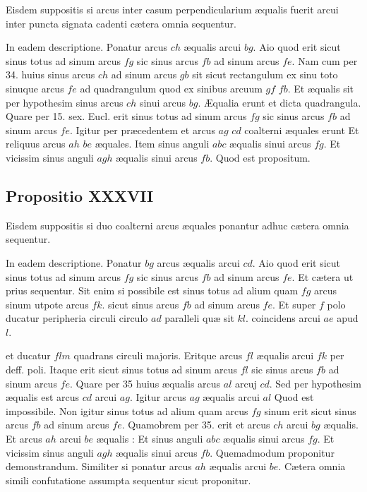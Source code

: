 \documentclass[11pt,a4paper]{article}
\begin{document}
Eisdem suppositis si arcus inter casum perpendicularium æqualis fuerit arcui inter puncta signata cadenti cætera omnia sequentur.

In eadem descriptione. Ponatur arcus $ch$ æqualis arcui $bg$. Aio quod erit sicut sinus totus ad sinum arcus $fg$ sic sinus arcus $fb$ ad sinum arcus $fe$. Nam cum per 34. huius sinus arcus $ch$ ad sinum arcus $gb$ sit sicut rectangulum ex sinu toto sinuque arcus $fe$ ad quadrangulum quod ex sinibus arcuum $gf$ $fb$. Et æqualis sit per hypothesim sinus arcus $ch$ sinui arcus $bg$. Æqualia erunt et dicta quadrangula. Quare per 15. sex. Eucl. erit sinus totus ad sinum arcus $fg$ sic sinus arcus $fb$ ad sinum arcus $fe$. Igitur per præcedentem et arcus $ag$ $cd$ coalterni æquales erunt Et reliquus arcus $ah$ $be$ æquales. Item sinus anguli $abc$ æqualis sinui arcus $fg$. Et vicissim sinus anguli $agh$ æqualis sinui arcus $fb$. Quod est propositum.

\subsection*{Propositio XXXVII}

Eisdem suppositis si duo coalterni arcus æquales ponantur adhuc cætera omnia sequentur.

In eadem descriptione. Ponatur $bg$ arcus æqualis arcui $cd$. Aio quod erit sicut sinus totus ad sinum arcus $fg$ sic sinus arcus $fb$ ad sinum arcus $fe$. Et cætera ut prius sequentur. Sit enim si possibile est sinus totus ad alium quam $fg$ arcus sinum utpote arcus $fk$. sicut sinus arcus $fb$ ad sinum arcus $fe$. Et super $f$ polo ducatur peripheria circuli circulo $ad$ paralleli quæ sit $kl$. coincidens arcui $ae$ apud $l$.

et ducatur $flm$ quadrans circuli majoris. Eritque arcus $fl$ æqualis arcui $fk$ per deff. poli. Itaque erit sicut sinus totus ad sinum arcus $fl$ sic sinus arcus $fb$ ad sinum arcus $fe$.  Quare per 35 huius æqualis arcus $al$ arcuj $cd$. Sed per hypothesim æqualis est arcus $cd$ arcui $ag$. Igitur arcus $ag$ æqualis arcui $al$ Quod est impossibile. Non igitur sinus totus ad alium quam arcus $fg$ sinum erit sicut sinus arcus $fb$ ad sinum arcus $fe$. Quamobrem per 35. erit et arcus $ch$ arcui $bg$ æqualis. Et arcus $ah$ arcui $be$ æqualis : Et sinus anguli $abc$ æqualis sinui arcus $fg$. Et vicissim sinus anguli $agh$ æqualis sinui arcus $fb$. Quemadmodum proponitur demonstrandum. Similiter si ponatur arcus $ah$ æqualis arcui $be$. Cætera omnia simili confutatione assumpta sequentur sicut proponitur.
\end{document}
